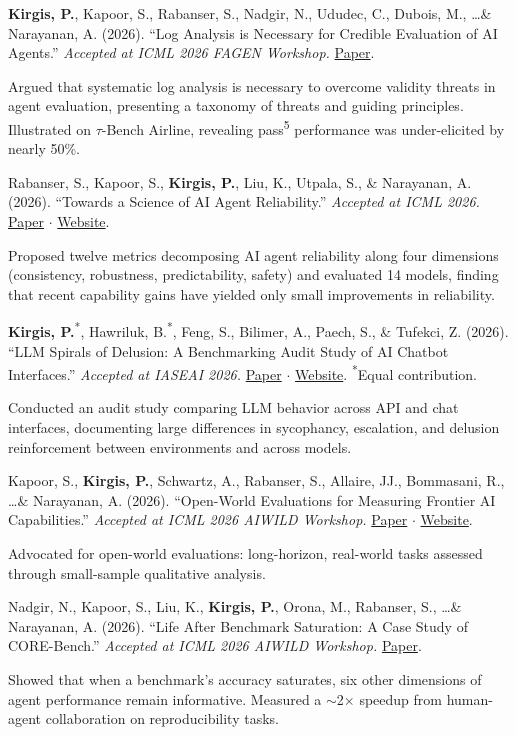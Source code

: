 \documentclass[11pt]{article}
\newcommand{\pub}[2]{%
  \par\vspace{0.5em}%
  \begin{list}{}{%
    \setlength{\leftmargin}{0.3in}%
    \setlength{\itemindent}{-0.3in}%
    \setlength{\topsep}{0pt}\setlength{\parsep}{0pt}\setlength{\partopsep}{0pt}%
  }
  \item #1%
  \par\vspace{0.2em}\small #2%
  \end{list}%
}
\begin{document}
\pub{%
  \textbf{Kirgis, P.}, Kapoor, S., Rabanser, S., Nadgir, N., Ududec, C., Dubois, M., \ldots \& Narayanan, A. (2026). ``Log Analysis is Necessary for Credible Evaluation of AI Agents.'' \textit{Accepted at ICML 2026 FAGEN Workshop.} \href{https://arxiv.org/pdf/2605.08545}{Paper}.%
}{%
  Argued that systematic log analysis is necessary to overcome validity threats in agent evaluation, presenting a taxonomy of threats and guiding principles. Illustrated on $\tau$-Bench Airline, revealing pass\textsuperscript{5} performance was under-elicited by nearly 50\%.%
}

\pub{%
  Rabanser, S., Kapoor, S., \textbf{Kirgis, P.}, Liu, K., Utpala, S., \& Narayanan, A. (2026). ``Towards a Science of AI Agent Reliability.'' \textit{Accepted at ICML 2026.} \href{https://arxiv.org/pdf/2602.16666}{Paper} $\cdot$ \href{https://hal.cs.princeton.edu/reliability/}{Website}.%
}{%
  Proposed twelve metrics decomposing AI agent reliability along four dimensions (consistency, robustness, predictability, safety) and evaluated 14 models, finding that recent capability gains have yielded only small improvements in reliability.%
}

\pub{%
  \textbf{Kirgis, P.}\textsuperscript{*}, Hawriluk, B.\textsuperscript{*}, Feng, S., Bilimer, A., Paech, S., \& Tufekci, Z. (2026). ``LLM Spirals of Delusion: A Benchmarking Audit Study of AI Chatbot Interfaces.'' \textit{Accepted at IASEAI 2026.} \href{https://arxiv.org/pdf/2604.06188}{Paper} $\cdot$ \href{https://llm-spirals-of-delusion.github.io/}{Website}. {\footnotesize\textsuperscript{*}Equal contribution.}%
}{%
  Conducted an audit study comparing LLM behavior across API and chat interfaces, documenting large differences in sycophancy, escalation, and delusion reinforcement between environments and across models.%
}

\pub{%
  Kapoor, S., \textbf{Kirgis, P.}, Schwartz, A., Rabanser, S., Allaire, JJ., Bommasani, R., \ldots \& Narayanan, A. (2026). ``Open-World Evaluations for Measuring Frontier AI Capabilities.'' \textit{Accepted at ICML 2026 AIWILD Workshop.} \href{https://arxiv.org/pdf/2605.20520}{Paper} $\cdot$ \href{https://cruxevals.com/crux-1}{Website}.%
}{%
  Advocated for open-world evaluations: long-horizon, real-world tasks assessed through small-sample qualitative analysis.%
}

\pub{%
  Nadgir, N., Kapoor, S., Liu, K., \textbf{Kirgis, P.}, Orona, M., Rabanser, S., \ldots \& Narayanan, A. (2026). ``Life After Benchmark Saturation: A Case Study of CORE-Bench.'' \textit{Accepted at ICML 2026 AIWILD Workshop.} \href{https://arxiv.org/pdf/2606.26158}{Paper}.%
}{%
  Showed that when a benchmark's accuracy saturates, six other dimensions of agent performance remain informative. Measured a $\sim$2$\times$ speedup from human-agent collaboration on reproducibility tasks.%
}
\end{document}
